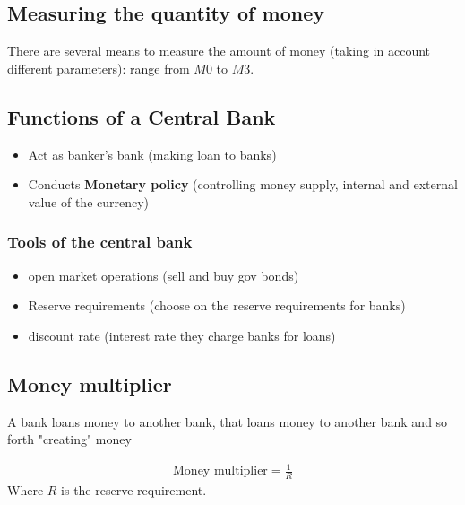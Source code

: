 \documentclass[a4paper,titlepage] {scrartcl}
\begin{document}
\subsection{Measuring the quantity of money} %
\label{sub:measuring_the_quantity_of_money}
There are several means to measure the amount of money (taking in account different parameters): range from 
$M0$ to $M3$.


\subsection{Functions of a Central Bank} %
\label{sub:functions_of_a_central_bank}

\begin{itemize}
	\item Act as banker's bank (making loan to banks)
	\item Conducts \textbf{Monetary policy} (controlling money supply, internal and external value of the currency)
\end{itemize}

\subsubsection{Tools of the central bank}
\begin{itemize}
	\item open market operations (sell and buy gov bonds)
	\item Reserve requirements (choose on the reserve requirements for banks)
	\item discount rate (interest rate they charge banks for loans)
\end{itemize}



\subsection{Money multiplier} %
\label{sub:money_multiplier}
A bank loans money to another bank, that loans money to another bank and so forth "creating" money

\begin{eqnarray*}
	\text{Money multiplier} = \frac{1}{R}
\end{eqnarray*}
Where $R$ is the reserve requirement.
\end{document}
